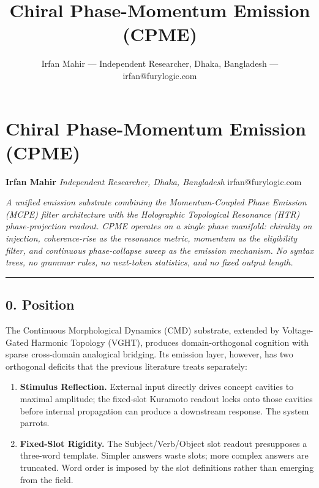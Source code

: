 \documentclass[
  11pt,
  a4paper,
]{article}
\title{Chiral Phase-Momentum Emission (CPME)}
\author{Irfan Mahir --- Independent Researcher, Dhaka, Bangladesh ---
irfan@furylogic.com}
\date{}
\providecommand{\tightlist}{%
  \setlength{\itemsep}{0pt}\setlength{\parskip}{0pt}}
\begin{document}
\maketitle

{
\hypersetup{linkcolor=}
\setcounter{tocdepth}{3}
\tableofcontents
}
\section{Chiral Phase-Momentum Emission
(CPME)}\label{chiral-phase-momentum-emission-cpme}

\textbf{Irfan Mahir} \emph{Independent Researcher, Dhaka, Bangladesh}
irfan@furylogic.com

\emph{A unified emission substrate combining the Momentum-Coupled Phase
Emission (MCPE) filter architecture with the Holographic Topological
Resonance (HTR) phase-projection readout. CPME operates on a single
phase manifold: chirality on injection, coherence-rise as the resonance
metric, momentum as the eligibility filter, and continuous
phase-collapse sweep as the emission mechanism. No syntax trees, no
grammar rules, no next-token statistics, and no fixed output length.}

\begin{center}\rule{0.5\linewidth}{0.5pt}\end{center}

\subsection{0. Position}\label{position}

The Continuous Morphological Dynamics (CMD) substrate, extended by
Voltage-Gated Harmonic Topology (VGHT), produces domain-orthogonal
cognition with sparse cross-domain analogical bridging. Its emission
layer, however, has two orthogonal deficits that the previous literature
treats separately:

\begin{enumerate}
\def\labelenumi{\arabic{enumi}.}
\tightlist
\item
  \textbf{Stimulus Reflection.} External input directly drives concept
  cavities to maximal amplitude; the fixed-slot Kuramoto readout locks
  onto those cavities before internal propagation can produce a
  downstream response. The system parrots.
\item
  \textbf{Fixed-Slot Rigidity.} The Subject/Verb/Object slot readout
  presupposes a three-word template. Simpler answers waste slots; more
  complex answers are truncated. Word order is imposed by the slot
  definitions rather than emerging from the field.
\end{enumerate}
\end{document}

